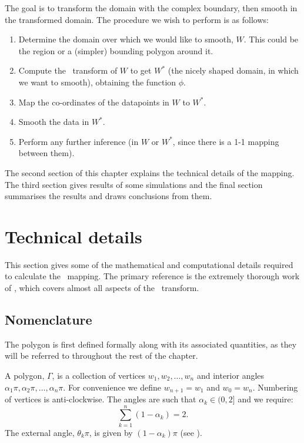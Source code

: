 The goal is to transform the domain with the complex boundary, then smooth in the transformed domain. The procedure we wish to perform is as follows:

\begin{enumerate}
\item Determine the domain over which we would like to smooth, $W$. This could be the region or a (simpler) bounding polygon around it.

\item Compute the \sch\ transform of $W$ to get $W^*$ (the nicely shaped domain, in which we want to smooth), obtaining the function $\phi$.

\item Map the co-ordinates of the datapoints in $W$ to $W^*$.

\item Smooth the data in $W^*$.

\item Perform any further inference (in $W$ or $W^*$, since there is a 1-1 mapping between them).
\end{enumerate}

The second section of this chapter explains the technical details of the mapping. The third section gives results of some simulations and the final section summarises the results and draws conclusions from them.

\section{Technical details}

This section gives some of the mathematical and computational details required to calculate the \sch\ mapping. The primary reference is the extremely thorough work of \cite{driscoll}, which covers almost all aspects of the \sch\ transform.

\subsection{Nomenclature}

The polygon is first defined formally along with its associated quantities, as they will be referred to throughout the rest of the chapter.

A polygon, $\Gamma$, is a collection of vertices $w_1, w_2,\dots,w_n$ and interior angles $\alpha_1\pi, \alpha_2\pi, \dots, \alpha_n\pi$. For convenience we define $w_{n+1} = w_1$ and $w_0=w_n$. Numbering of vertices is anti-clockwise. The angles are such that $\alpha_k \in (0,2]$ and we require:
\begin{equation}
\sum_{k=1}^n (1-\alpha_k) = 2.
\end{equation}
The external angle, $\theta_k\pi$, is given by $(1-\alpha_k)\pi$ (see ).

